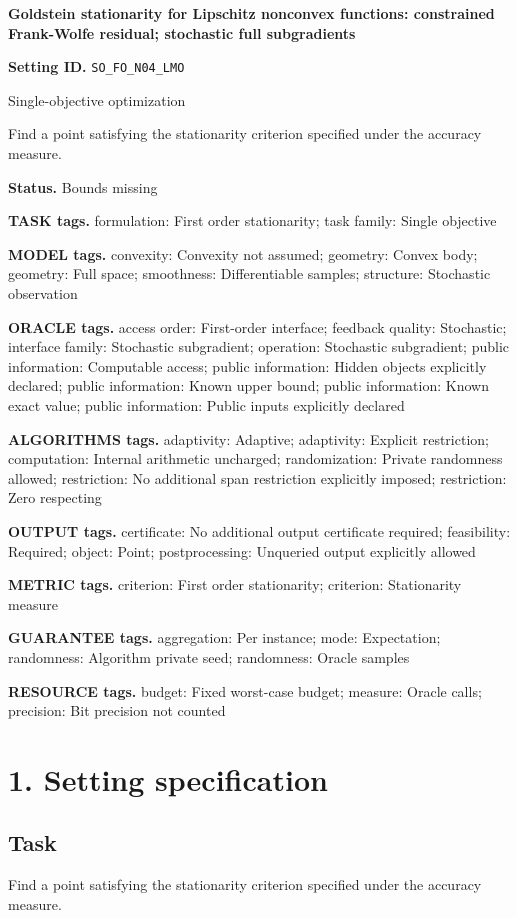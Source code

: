 \documentclass[10pt,a4paper]{article}
\begin{document}
\raggedright

{\LARGE\bfseries\sffamily\color{AtlasNavy} Goldstein stationarity for Lipschitz nonconvex functions: constrained Frank-Wolfe residual; stochastic full subgradients\par}\vspace{5pt}
\textbf{Setting ID.} \texttt{SO\_\allowbreak{}FO\_\allowbreak{}N04\_\allowbreak{}LMO}

Single-objective optimization

Find a point satisfying the stationarity criterion specified under the accuracy measure.

\textbf{Status.} Bounds missing

\textbf{TASK tags.} formulation: First order stationarity; task family: Single objective

\textbf{MODEL tags.} convexity: Convexity not assumed; geometry: Convex body; geometry: Full space; smoothness: Differentiable samples; structure: Stochastic observation

\textbf{ORACLE tags.} access order: First-order interface; feedback quality: Stochastic; interface family: Stochastic subgradient; operation: Stochastic subgradient; public information: Computable access; public information: Hidden objects explicitly declared; public information: Known upper bound; public information: Known exact value; public information: Public inputs explicitly declared

\textbf{ALGORITHMS tags.} adaptivity: Adaptive; adaptivity: Explicit restriction; computation: Internal arithmetic uncharged; randomization: Private randomness allowed; restriction: No additional span restriction explicitly imposed; restriction: Zero respecting

\textbf{OUTPUT tags.} certificate: No additional output certificate required; feasibility: Required; object: Point; postprocessing: Unqueried output explicitly allowed

\textbf{METRIC tags.} criterion: First order stationarity; criterion: Stationarity measure

\textbf{GUARANTEE tags.} aggregation: Per instance; mode: Expectation; randomness: Algorithm private seed; randomness: Oracle samples

\textbf{RESOURCE tags.} budget: Fixed worst-case budget; measure: Oracle calls; precision: Bit precision not counted

\section{1. Setting specification}
\subsection{Task}
Find a point satisfying the stationarity criterion specified under the accuracy measure.
\end{document}
